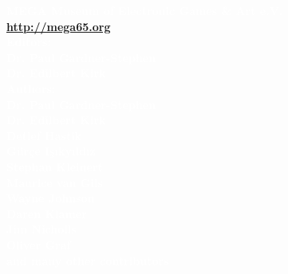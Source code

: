
\begin{center}

\textbf{\large\textcolor{white}{MEGA Museum of Electronic Games \& Art e.V. \\
\vspace{3mm}
\url{http://mega65.org}}}\\
\vspace{6mm}
\textbf{\large\textcolor{white}{
Editors:\\
\vspace{2mm}
Dr. Paul Gardner-Stephen\\
Dr. Edilbert Kirk\\
\vspace{6mm}
Authors: \\
\vspace{2mm}
Dr. Paul Gardner-Stephen\\
Dr. Edilbert Kirk\\
Detlef Hastik\\
Gürçe Işıkyıldız\\
Stephan Kleinert\\
Maurice van Gils\\
Wayne Johnson\\
Daren Klamer\\
Jim Nicholls\\
Oliver Graf\\
\vspace{6mm}
and many other contributors\\
}}
\vspace{5.1cm}
\colorbox{white}{\EANisbn[ISBN=978-064529-680-8,SC4]}
\end{center}



